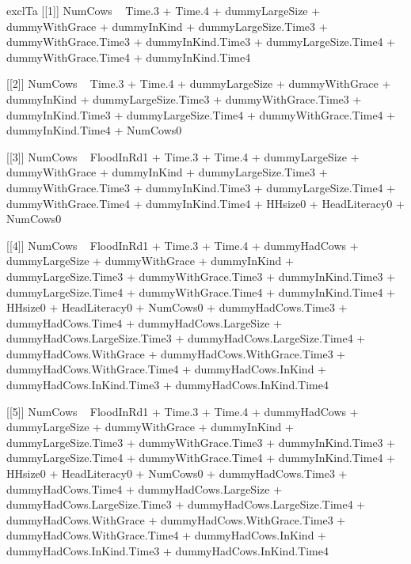 \begin{Schunk}
\begin{Soutput}
[1] exclTa
[[1]]
NumCows ~ Time.3 + Time.4 + dummyLargeSize + dummyWithGrace + 
    dummyInKind + dummyLargeSize.Time3 + dummyWithGrace.Time3 + 
    dummyInKind.Time3 + dummyLargeSize.Time4 + dummyWithGrace.Time4 + 
    dummyInKind.Time4

[[2]]
NumCows ~ Time.3 + Time.4 + dummyLargeSize + dummyWithGrace + 
    dummyInKind + dummyLargeSize.Time3 + dummyWithGrace.Time3 + 
    dummyInKind.Time3 + dummyLargeSize.Time4 + dummyWithGrace.Time4 + 
    dummyInKind.Time4 + NumCows0

[[3]]
NumCows ~ FloodInRd1 + Time.3 + Time.4 + dummyLargeSize + dummyWithGrace + 
    dummyInKind + dummyLargeSize.Time3 + dummyWithGrace.Time3 + 
    dummyInKind.Time3 + dummyLargeSize.Time4 + dummyWithGrace.Time4 + 
    dummyInKind.Time4 + HHsize0 + HeadLiteracy0 + NumCows0

[[4]]
NumCows ~ FloodInRd1 + Time.3 + Time.4 + dummyHadCows + dummyLargeSize + 
    dummyWithGrace + dummyInKind + dummyLargeSize.Time3 + dummyWithGrace.Time3 + 
    dummyInKind.Time3 + dummyLargeSize.Time4 + dummyWithGrace.Time4 + 
    dummyInKind.Time4 + HHsize0 + HeadLiteracy0 + NumCows0 + 
    dummyHadCows.Time3 + dummyHadCows.Time4 + dummyHadCows.LargeSize + 
    dummyHadCows.LargeSize.Time3 + dummyHadCows.LargeSize.Time4 + 
    dummyHadCows.WithGrace + dummyHadCows.WithGrace.Time3 + dummyHadCows.WithGrace.Time4 + 
    dummyHadCows.InKind + dummyHadCows.InKind.Time3 + dummyHadCows.InKind.Time4

[[5]]
NumCows ~ FloodInRd1 + Time.3 + Time.4 + dummyHadCows + dummyLargeSize + 
    dummyWithGrace + dummyInKind + dummyLargeSize.Time3 + dummyWithGrace.Time3 + 
    dummyInKind.Time3 + dummyLargeSize.Time4 + dummyWithGrace.Time4 + 
    dummyInKind.Time4 + HHsize0 + HeadLiteracy0 + NumCows0 + 
    dummyHadCows.Time3 + dummyHadCows.Time4 + dummyHadCows.LargeSize + 
    dummyHadCows.LargeSize.Time3 + dummyHadCows.LargeSize.Time4 + 
    dummyHadCows.WithGrace + dummyHadCows.WithGrace.Time3 + dummyHadCows.WithGrace.Time4 + 
    dummyHadCows.InKind + dummyHadCows.InKind.Time3 + dummyHadCows.InKind.Time4
\end{Soutput}
\end{Schunk}


